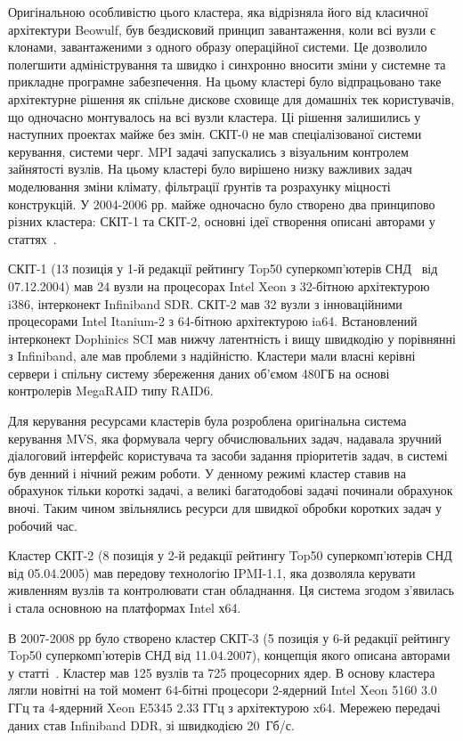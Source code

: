 Оригінальною особливістю цього кластера, яка відрізняла його від класичної архітектури Beowulf, був бездисковий принцип завантаження, коли всі вузли є клонами, завантаженими з одного образу операційної системи. Це дозволило полегшити адміністрування та швидко і синхронно вносити зміни у системне та прикладне програмне забезпечення. На цьому кластері було відпрацьовано таке архітектурне рішення як спільне дискове сховище для домашніх тек користувачів, що одночасно монтувалось на всі вузли кластера. Ці рішення залишились у наступних проектах майже без змін. СКІТ-0 не мав спеціалізованої системи керування, системи черг. MPI задачі запускались з візуальним контролем зайнятості вузлів. На цьому кластері було вирішено низку важливих задач моделювання зміни клімату, фільтрації ґрунтів та розрахунку міцності конструкцій.
У 2004-2006 рр. майже одночасно було створено два принципово різних кластера: СКІТ-1 та СКІТ-2, основні ідеї створення описані авторами у статтях~\cite{cluster-art,scit-art,polzovatel-int-art}.  

СКІТ-1 (13 позиція у 1-й редакції рейтингу Top50 суперкомп’ютерів СНД~\cite{top50} від 07.12.2004) мав 24 вузли на процесорах Intel Xeon з 32-бітною архітектурою i386, інтерконект Infiniband SDR. СКІТ-2 мав 32 вузли з інноваційними процесорами Intel Itanium-2 з 64-бітною архітектурою ia64. Встановлений інтерконект Dophinics SCI мав нижчу латентність і вищу швидкодію у порівнянні з Infiniband, але мав проблеми з надійністю.  Кластери мали власні керівні сервери і спільну систему збереження даних об'ємом 480ГБ на основі контролерів MegaRAID типу RAID6.

Для керування ресурсами кластерів була розроблена оригінальна система керування MVS, яка формувала чергу обчислювальних задач, надавала зручний діалоговий інтерфейс користувача та засоби задання пріоритетів задач, в системі був денний і нічний режим роботи. У денному режимі кластер ставив на обрахунок тільки короткі задачі, а великі багатодобові задачі починали обрахунок вночі. Таким чином звільнялись ресурси для швидкої обробки коротких задач у робочий час.

Кластер СКІТ-2 (8 позиція у 2-й редакції рейтингу Top50 суперкомп’ютерів СНД від 05.04.2005) мав передову технологію IPMI-1.1, яка дозволяла керувати живленням вузлів та контролювати стан обладнання. Ця система згодом з'явилась і стала основною на платформах Intel х64. 

В 2007-2008 рр було створено кластер СКІТ-3 (5 позиція у 6-й редакції рейтингу Top50 суперкомп’ютерів СНД від 11.04.2007), концепція якого описана авторами у статті~\cite{50anniv-art}. Кластер мав 125 вузлів та 725 процесорних ядер. В основу кластера лягли новітні на той момент 64-бітні процесори 2-ядерний Intel Xeon 5160 3.0 ГГц та  4-ядерний Xeon E5345 2.33 ГГц з архітектурою x64. Мережею передачі даних став Infiniband DDR, зі швидкодією 20~Гб/с.    


